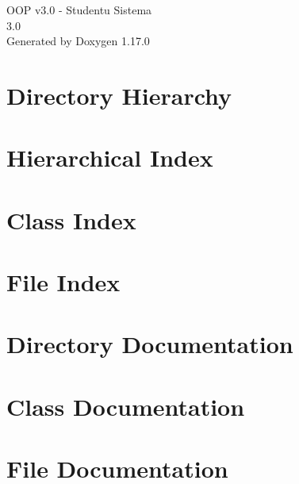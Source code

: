 \documentclass[twoside]{book}
\newcommand{\+}{\discretionary{\mbox{\scriptsize$\hookleftarrow$}}{}{}}
\newcommand{\clearemptydoublepage}{%
    \newpage{\pagestyle{empty}\cleardoublepage}%
  }
\begin{document}
  \raggedbottom
    \hypersetup{pageanchor=false,
                bookmarksnumbered=true,
                pdfencoding=unicode
               }
  \begin{titlepage}
  \vspace*{7cm}
  \begin{center}%
  {\Large OOP v3.\+0 -\/ Studentu Sistema}\\
  [1ex]\large 3.\+0 \\
  \vspace*{1cm}
  {\large Generated by Doxygen 1.17.0}\\
  \end{center}
  \end{titlepage}
  \clearemptydoublepage
  \tableofcontents
  \clearemptydoublepage
  \hypersetup{pageanchor=true}
\chapter{Directory Hierarchy}

\chapter{Hierarchical Index}

\chapter{Class Index}

\chapter{File Index}

\chapter{Directory Documentation}


\chapter{Class Documentation}



\chapter{File Documentation}










  \backmatter
  \newpage
  \clearemptydoublepage
  \printindex
\end{document}
